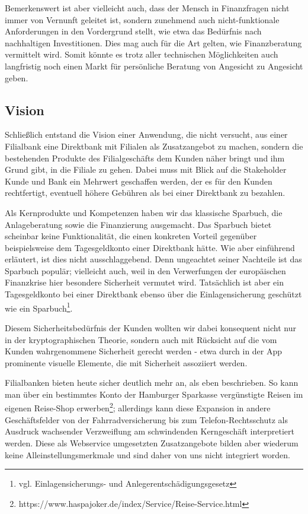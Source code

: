  Bemerkenswert ist aber vielleicht auch, dass der Mensch in Finanzfragen nicht immer von Vernunft geleitet ist, sondern zunehmend auch nicht-funktionale Anforderungen in den Vordergrund stellt, wie etwa das Bedürfnis nach nachhaltigen Investitionen. Dies mag auch für die Art gelten, wie Finanzberatung vermittelt wird. Somit könnte es trotz aller technischen Möglichkeiten auch langfristig noch einen Markt für persönliche Beratung von Angesicht zu Angesicht geben.
 
\subsection{Vision}

Schließlich entstand die Vision einer Anwendung, die nicht versucht, aus einer Filialbank eine Direktbank mit Filialen als Zusatzangebot zu machen, sondern die bestehenden Produkte des Filialgeschäfts dem Kunden näher bringt und ihm Grund gibt, in die Filiale zu gehen. Dabei muss mit Blick auf die Stakeholder Kunde und Bank ein Mehrwert geschaffen werden, der es für den Kunden rechtfertigt, eventuell höhere Gebühren als bei einer Direktbank zu bezahlen.

Als Kernprodukte und Kompetenzen haben wir das klassische Sparbuch, die Anlageberatung sowie die Finanzierung ausgemacht. Das Sparbuch bietet scheinbar keine Funktionalität, die einen konkreten Vorteil gegenüber beispielsweise dem Tagesgeldkonto einer Direktbank hätte. Wie aber einführend erläutert, ist dies nicht ausschlaggebend. Denn ungeachtet seiner Nachteile ist das Sparbuch populär; vielleicht auch, weil in den Verwerfungen der europäischen Finanzkrise hier besondere Sicherheit vermutet wird. Tatsächlich ist aber ein Tagesgeldkonto bei einer Direktbank ebenso über die Einlagensicherung geschützt wie ein Sparbuch\footnote{vgl. Einlagensicherungs- und Anlegerentschädigungsgesetz}.

Diesem Sicherheitsbedürfnis der Kunden wollten wir dabei konsequent nicht nur in der kryptographischen Theorie, sondern auch mit Rücksicht auf die vom Kunden wahrgenommene Sicherheit gerecht werden - etwa durch in der App prominente visuelle Elemente, die mit Sicherheit assoziiert werden.

Filialbanken bieten heute sicher deutlich mehr an, als eben beschrieben. So kann man über ein bestimmtes Konto der Hamburger Sparkasse vergünstigte Reisen im eigenen Reise-Shop erwerben\footnote{https://www.haspajoker.de/index/Service/Reise-Service.html}; allerdings kann diese Expansion in andere Geschäftsfelder von der Fahrradversicherung bis zum Telefon-Rechtsschutz als Ausdruck wachsender Verzweiflung am schwindenden Kerngeschäft interpretiert werden. Diese als Webservice umgesetzten Zusatzangebote bilden aber wiederum keine Alleinstellungsmerkmale und sind daher von uns nicht integriert worden.

